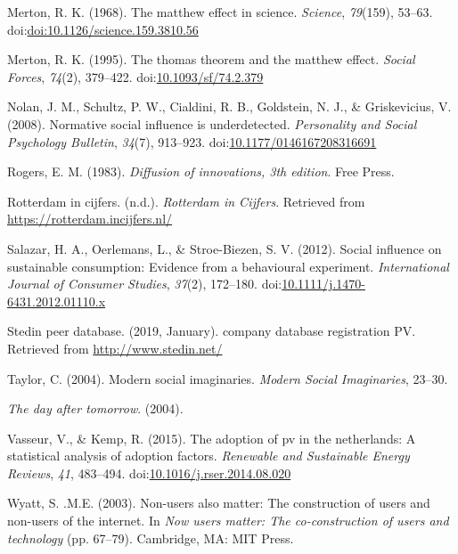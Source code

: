 \documentclass[man,floatsintext]{apa6}
\begin{document}
\hypertarget{ref-merton_1968}{}
Merton, R. K. (1968). The matthew effect in science. \emph{Science},
\emph{79}(159), 53--63.
doi:\href{https://doi.org/doi:10.1126/science.159.3810.56}{doi:10.1126/science.159.3810.56}

\hypertarget{ref-merton_1995}{}
Merton, R. K. (1995). The thomas theorem and the matthew effect.
\emph{Social Forces}, \emph{74}(2), 379--422.
doi:\href{https://doi.org/10.1093/sf/74.2.379}{10.1093/sf/74.2.379}

\hypertarget{ref-schultz_2008}{}
Nolan, J. M., Schultz, P. W., Cialdini, R. B., Goldstein, N. J., \&
Griskevicius, V. (2008). Normative social influence is underdetected.
\emph{Personality and Social Psychology Bulletin}, \emph{34}(7),
913--923.
doi:\href{https://doi.org/10.1177/0146167208316691}{10.1177/0146167208316691}

\hypertarget{ref-rogers_1983}{}
Rogers, E. M. (1983). \emph{Diffusion of innovations, 3th edition}. Free
Press.

\hypertarget{ref-rotterdam_in_cijfers}{}
Rotterdam in cijfers. (n.d.). \emph{Rotterdam in Cijfers}. Retrieved
from \url{https://rotterdam.incijfers.nl/}

\hypertarget{ref-salazar_2012}{}
Salazar, H. A., Oerlemans, L., \& Stroe-Biezen, S. V. (2012). Social
influence on sustainable consumption: Evidence from a behavioural
experiment. \emph{International Journal of Consumer Studies},
\emph{37}(2), 172--180.
doi:\href{https://doi.org/10.1111/j.1470-6431.2012.01110.x}{10.1111/j.1470-6431.2012.01110.x}

\hypertarget{ref-stedin}{}
Stedin peer database. (2019, January). company database registration PV.
Retrieved from \url{http://www.stedin.net/}

\hypertarget{ref-taylor_2004}{}
Taylor, C. (2004). Modern social imaginaries. \emph{Modern Social
Imaginaries}, 23--30.

\hypertarget{ref-DAT}{}
\emph{The day after tomorrow}. (2004).

\hypertarget{ref-vasseur_kemp_2015}{}
Vasseur, V., \& Kemp, R. (2015). The adoption of pv in the netherlands:
A statistical analysis of adoption factors. \emph{Renewable and
Sustainable Energy Reviews}, \emph{41}, 483--494.
doi:\href{https://doi.org/10.1016/j.rser.2014.08.020}{10.1016/j.rser.2014.08.020}

\hypertarget{ref-Wyatt_2003}{}
Wyatt, S. .M.E. (2003). Non-users also matter: The construction of users
and non-users of the internet. In \emph{Now users matter: The
co-construction of users and technology} (pp. 67--79). Cambridge, MA:
MIT Press.

\endgroup

\clearpage

\renewcommand{\listfigurename}{Figure captions}

\listoffigures

\clearpage

\renewcommand{\listtablename}{Table captions}

\listoftables
\end{document}

